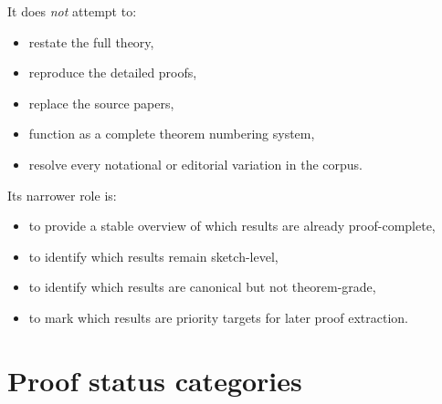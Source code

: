 \documentclass[12pt]{article}
\begin{document}
	It does \emph{not} attempt to:
	\begin{itemize}[leftmargin=2em]
		\item restate the full theory,
		\item reproduce the detailed proofs,
		\item replace the source papers,
		\item function as a complete theorem numbering system,
		\item resolve every notational or editorial variation in the corpus.
	\end{itemize}
	
	Its narrower role is:
	\begin{itemize}[leftmargin=2em]
		\item to provide a stable overview of which results are already proof-complete,
		\item to identify which results remain sketch-level,
		\item to identify which results are canonical but not theorem-grade,
		\item to mark which results are priority targets for later proof extraction.
	\end{itemize}
	
	\section{Proof status categories}
	
\end{document}
